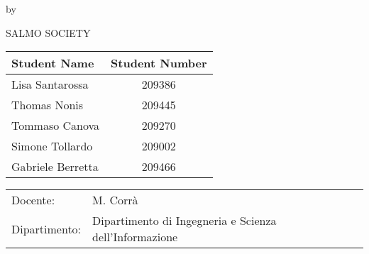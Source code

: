 \begin{titlepage}

\begin{center}

{\makeatletter
\largetitlestyle\fontsize{28}{28}\selectfont\@title
\makeatother}

{\makeatletter
\ifdefvoid{\@subtitle}{}{\bigskip\titlestyle\fontsize{15}{15}\selectfont\@subtitle}
\makeatother}

\bigskip
\bigskip

by

\bigskip

{\makeatletter
\largetitlestyle\fontsize{25}{25}\selectfont SALMO SOCIETY
\makeatother}

\bigskip
\bigskip

\setlength\extrarowheight{2pt}
\begin{tabular}{lc}
    Student Name & Student Number \\\midrule
    Lisa Santarossa & 209386\\
    Thomas Nonis & 209445\\
    Tommaso Canova & 209270\\
    Simone Tollardo & 209002\\
    Gabriele Berretta & 209466 \\
\end{tabular}

\vfill

\begin{tabular}{ll}
    Docente: & M. Corrà \\
    Dipartimento: & Dipartimento di Ingegneria e Scienza dell'Informazione
\end{tabular}

\bigskip
\bigskip

\end{center}

\end{titlepage}
